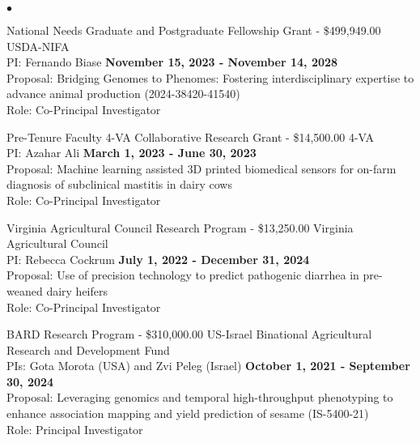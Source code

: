\documentclass[margin,line,10pt]{res}
\newenvironment{list2}{
  \begin{list}{$\bullet$}{%
      \setlength{\itemsep}{0in}
      \setlength{\parsep}{0in} \setlength{\parskip}{0in}
      \setlength{\topsep}{0in} \setlength{\partopsep}{0in} 
      \setlength{\leftmargin}{0.2in}}}{\end{list}}
\begin{document}
\begin{resume}
\begin{list2}
  \item National Needs Graduate and Postgraduate Fellowship Grant  - \$499,949.00  \hfill USDA-NIFA \\
  PI: Fernando Biase  \hfill \textbf{November 15, 2023 - November 14, 2028}\\
Proposal: Bridging Genomes to Phenomes: Fostering interdisciplinary expertise to advance animal production (2024-38420-41540)\\
Role: Co-Principal Investigator \\

\vspace{0.5cm}

  \item Pre-Tenure Faculty 4-VA Collaborative Research Grant - \$14,500.00  \hfill 4-VA \\
  PI: Azahar Ali  \hfill \textbf{March 1, 2023 - June 30, 2023}\\
Proposal: Machine learning assisted 3D printed biomedical sensors for on-farm diagnosis of subclinical mastitis in dairy cows  \\
Role: Co-Principal Investigator \\

\vspace{0.5cm}


  \item Virginia Agricultural Council Research Program - \$13,250.00  \hfill Virginia Agricultural Council \\
  PI: Rebecca Cockrum  \hfill \textbf{July 1, 2022 - December 31, 2024}\\
Proposal: Use of precision technology to predict pathogenic diarrhea in pre-weaned dairy heifers  \\
Role: Co-Principal Investigator \\

\vspace{0.5cm}


\item BARD Research Program - \$310,000.00  \hfill US-Israel Binational Agricultural Research and Development Fund  \\
  PIs: Gota Morota (USA) and Zvi Peleg (Israel)   \hfill \textbf{October 1, 2021 -  September 30, 2024}\\
Proposal: Leveraging genomics and temporal high-throughput phenotyping to enhance association mapping and yield prediction of sesame (IS-5400-21) \\
Role: Principal Investigator \\



\end{list2}
\end{resume}
\end{document}
